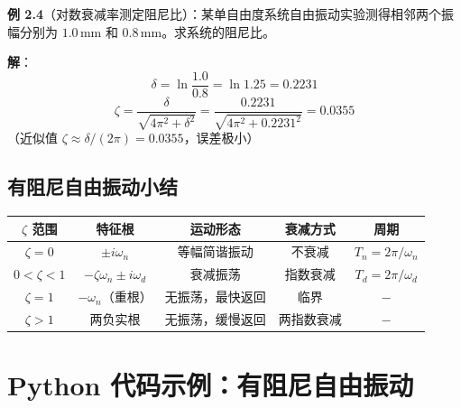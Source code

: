 \textbf{例 2.4}（对数衰减率测定阻尼比）：某单自由度系统自由振动实验测得相邻两个振幅分别为 $1.0\,\text{mm}$ 和 $0.8\,\text{mm}$。求系统的阻尼比。

\textbf{解}：
\[
\delta = \ln\frac{1.0}{0.8} = \ln 1.25 = 0.2231
\]
\[
\zeta = \frac{\delta}{\sqrt{4\pi^2 + \delta^2}} = \frac{0.2231}{\sqrt{4\pi^2 + 0.2231^2}} = 0.0355
\]
（近似值 $\zeta \approx \delta/(2\pi) = 0.0355$，误差极小）

\subsection{有阻尼自由振动小结}

\begin{center}
\begin{tabular}{c|c|c|c|c}
\hline
$\zeta$ 范围 & 特征根 & 运动形态 & 衰减方式 & 周期\\
\hline
$\zeta = 0$ & $\pm i\omega_n$ & 等幅简谐振动 & 不衰减 & $T_n = 2\pi/\omega_n$\\
$0<\zeta<1$ & $-\zeta\omega_n\pm i\omega_d$ & 衰减振荡 & 指数衰减 & $T_d = 2\pi/\omega_d$\\
$\zeta = 1$ & $-\omega_n$（重根） & 无振荡，最快返回 & 临界 & $-$\\
$\zeta > 1$ & 两负实根 & 无振荡，缓慢返回 & 两指数衰减 & $-$\\
\hline
\end{tabular}
\end{center}

\section{Python 代码示例：有阻尼自由振动}

